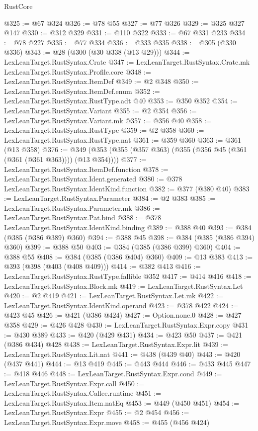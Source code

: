 \begin{lexlean}{RustCore}
\begin{coremodule}
@325 := @67 @324
@326 := @78 @55
@327 := @77 @326
@329 := @325 @327 @147
@330 := @312 @329
@331 := @110 @322
@333 := @67 @331 @233
@334 := @78 @227
@335 := @77 @334
@336 := @333 @335
@338 := @305 (@330 @336)
@343 := @28 (@300 (@30 @338 (@13 @29)))
@344 := LexLeanTarget.RustSyntax.Crate
@347 := LexLeanTarget.RustSyntax.Crate.mk LexLeanTarget.RustSyntax.Profile.core
@348 := LexLeanTarget.RustSyntax.ItemDef
@349 := @2 @348
@350 := LexLeanTarget.RustSyntax.ItemDef.enum
@352 := LexLeanTarget.RustSyntax.RustType.adt @40
@353 := @350 @352
@354 := LexLeanTarget.RustSyntax.Variant
@355 := @2 @354
@356 := LexLeanTarget.RustSyntax.Variant.mk
@357 := @356 @40
@358 := LexLeanTarget.RustSyntax.RustType
@359 := @2 @358
@360 := LexLeanTarget.RustSyntax.RustType.nat
@361 := @359 @360
@363 := @361 (@13 @358)
@376 := @349 (@353 (@355 (@357 @363) (@355 (@356 @45 (@361 (@361 (@361 @363)))) (@13 @354))))
@377 := LexLeanTarget.RustSyntax.ItemDef.function
@378 := LexLeanTarget.RustSyntax.Ident.generated
@380 := @378 LexLeanTarget.RustSyntax.IdentKind.function
@382 := @377 (@380 @40)
@383 := LexLeanTarget.RustSyntax.Parameter
@384 := @2 @383
@385 := LexLeanTarget.RustSyntax.Parameter.mk
@386 := LexLeanTarget.RustSyntax.Pat.bind
@388 := @378 LexLeanTarget.RustSyntax.IdentKind.binding
@389 := @388 @40
@393 := @384 (@385 (@386 @389) @360)
@394 := @388 @45
@398 := @384 (@385 (@386 @394) @360)
@399 := @388 @50
@403 := @384 (@385 (@386 @399) @360)
@404 := @388 @55
@408 := @384 (@385 (@386 @404) @360)
@409 := @13 @383
@413 := @393 (@398 (@403 (@408 @409)))
@414 := @382 @413
@416 := LexLeanTarget.RustSyntax.RustType.fallible @352
@417 := @414 @416
@418 := LexLeanTarget.RustSyntax.Block.mk
@419 := LexLeanTarget.RustSyntax.Let
@420 := @2 @419
@421 := LexLeanTarget.RustSyntax.Let.mk
@422 := LexLeanTarget.RustSyntax.IdentKind.operand
@423 := @378 @422
@424 := @423 @45
@426 := @421 (@386 @424)
@427 := Option.none.{0}
@428 := @427 @358
@429 := @426 @428
@430 := LexLeanTarget.RustSyntax.Expr.copy
@431 := @430 @389
@433 := @420 (@429 @431)
@434 := @423 @50
@437 := @421 (@386 @434) @428
@438 := LexLeanTarget.RustSyntax.Expr.lit
@439 := LexLeanTarget.RustSyntax.Lit.nat
@441 := @438 (@439 @40)
@443 := @420 (@437 @441)
@444 := @13 @419
@445 := @443 @444
@446 := @433 @445
@447 := @418 @446
@448 := LexLeanTarget.RustSyntax.Expr.cond
@449 := LexLeanTarget.RustSyntax.Expr.call
@450 := LexLeanTarget.RustSyntax.Callee.runtime
@451 := LexLeanTarget.RustSyntax.Item.natEq
@453 := @449 (@450 @451)
@454 := LexLeanTarget.RustSyntax.Expr
@455 := @2 @454
@456 := LexLeanTarget.RustSyntax.Expr.move
@458 := @455 (@456 @424)

\end{coremodule}
\end{lexlean}
